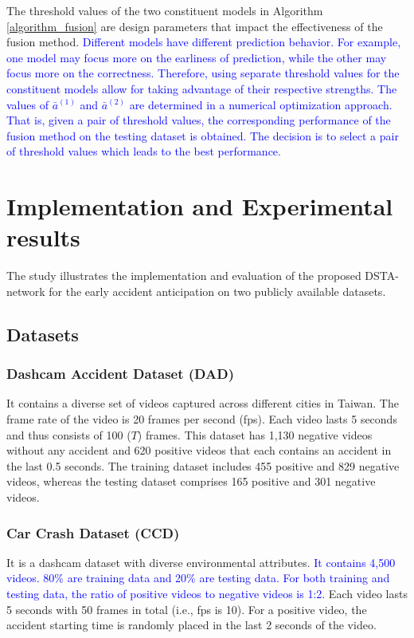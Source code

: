 \documentclass[journal]{IEEEtran}
\begin{document}
The threshold values of the two constituent models in Algorithm \ref{algorithm_fusion} are design parameters that impact the effectiveness of the fusion method. \textcolor{blue}{Different models have different prediction behavior. For example, one model may focus more on the earliness of prediction, while the other may focus more on the correctness. Therefore, using separate threshold values for the constituent models allow for taking advantage of their respective strengths. The values of $\bar{a}^{(1)}$ and $\bar{a}^{(2)}$ are determined in a numerical optimization approach. That is, given a pair of threshold values, the corresponding performance of the fusion method on the testing dataset is obtained. The decision is to select a pair of threshold values which leads to the best performance.}

\section{Implementation and Experimental results}
The study illustrates the implementation and evaluation of the proposed DSTA-network for the early accident anticipation on two publicly available datasets. 

\subsection{Datasets}



\subsubsection{Dashcam Accident Dataset (DAD) \cite{chan2016anticipating}} It contains a diverse set of videos captured across different cities in Taiwan. The frame rate of the video is 20 frames per second (fps). Each video lasts 5 seconds and thus consists of 100 ($T$) frames. This dataset has 1,130 negative videos without any accident and 620 positive videos that each contains an accident in the last 0.5 seconds. The training dataset includes 455 positive and 829 negative videos, whereas the testing dataset comprises 165 positive and 301 negative videos. 

\subsubsection{Car Crash Dataset (CCD) \cite{bao2020uncertainty}}
It is a dashcam dataset with diverse environmental attributes. \textcolor{blue}{It contains 4,500 videos. 80\% are training data and 20\% are testing data. For both training and testing data, the ratio of positive videos to negative videos is 1:2.} Each video lasts 5 seconds with 50 frames in total (i.e., fps is 10). For a positive video, the accident starting time is randomly placed in the last 2 seconds of the video.
\end{document}

